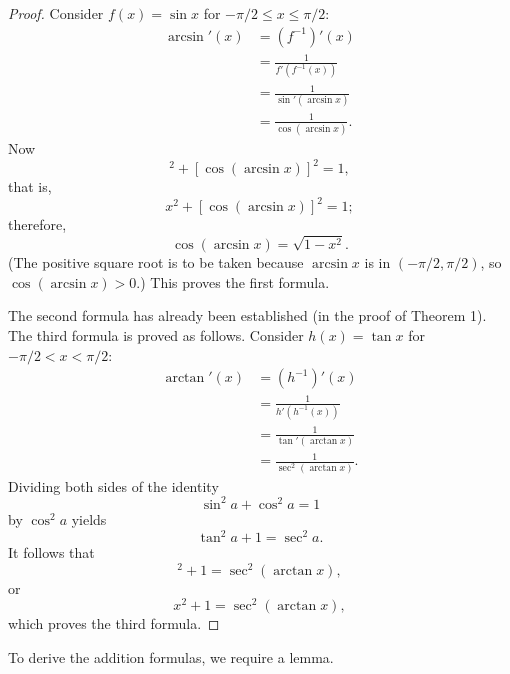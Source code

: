 \documentclass{article}
\begin{document}
\begin{proof}
  Consider $f(x) = \sin x$ for $-\pi/2 \leq x \leq \pi/2$: \begin{align*}
    \arcsin'(x)
      &= (f^{-1})'(x) \\
      &= \frac{1}{f'(f^{-1}(x))} \\
      &= \frac{1}{\sin'(\arcsin x)} \\
      &= \frac{1}{\cos(\arcsin x)}.
  \end{align*} Now \begin{equation*}
    [\sin(\arcsin x)]^2 + [\cos(\arcsin x)]^2 = 1,
  \end{equation*} that is, \begin{equation*}
    x^2 + [\cos(\arcsin x)]^2 = 1;
  \end{equation*} therefore, \begin{equation*}
    \cos(\arcsin x) = \sqrt{1 - x^2}.
  \end{equation*} (The positive square root is to be taken because $\arcsin x$
  is in $(-\pi/2, \pi/2)$, so $\cos(\arcsin x) > 0$.) This proves the first
  formula.

  The second formula has already been established (in the proof of Theorem 1).
  The third formula is proved as follows. Consider $h(x) = \tan x$ for $-\pi/2
  < x < \pi/2$: \begin{align*}
    \arctan'(x)
      &= (h^{-1})'(x) \\
      &= \frac{1}{h'(h^{-1}(x))} \\
      &= \frac{1}{\tan'(\arctan x)} \\
      &= \frac{1}{\sec^2(\arctan x)}.
  \end{align*} Dividing both sides of the identity \begin{equation*}
    \sin^2 a + \cos^2 a = 1
  \end{equation*} by $\cos^2 a$ yields \begin{equation*}
    \tan^2 a + 1 = \sec^2 a.
  \end{equation*} It follows that \begin{equation*}
    [\tan(\arctan x)]^2 + 1 = \sec^2(\arctan x),
  \end{equation*} or \begin{equation*}
    x^2 + 1 = \sec^2(\arctan x),
  \end{equation*} which proves the third formula.
\end{proof}

To derive the addition formulas, we require a lemma.
\end{document}
